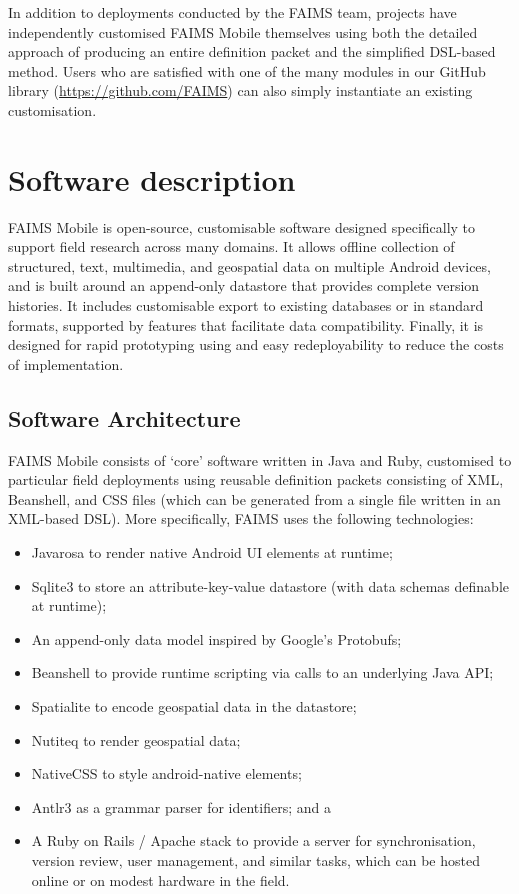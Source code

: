 \documentclass[preprint,12pt, a4paper]{elsarticle}
\begin{document}
In addition to deployments conducted by the FAIMS team, projects have independently customised FAIMS Mobile themselves using both the detailed approach of producing an entire definition packet and the simplified DSL-based method\cite{Good2016-gf, Kiley2016-sf}. Users who are satisfied with one of the many modules in our GitHub library (\url{https://github.com/FAIMS}) can also simply instantiate an existing customisation.

\section{Software description}


FAIMS Mobile is open-source, customisable software designed specifically to support field research across many domains. It allows offline collection of structured, text, multimedia, and geospatial data on multiple Android devices, and is built around an append-only datastore that provides complete version histories. It includes customisable export to existing databases or in standard formats, supported by features that facilitate data compatibility. Finally, it is designed for rapid prototyping using and easy redeployability to reduce the costs of implementation. 


\subsection{Software Architecture}



FAIMS Mobile consists of `core' software written in Java and Ruby, customised to particular field deployments using reusable definition packets consisting of XML, Beanshell, and CSS files (which can be generated from a single file written in an XML-based DSL). More specifically, FAIMS uses the following technologies:

\begin{itemize}
\item Javarosa to render native Android UI elements at runtime;
\item Sqlite3 to store an attribute-key-value datastore (with data schemas definable at runtime);
\item An append-only data model inspired by Google's Protobufs;
\item Beanshell to provide runtime scripting via calls to an underlying Java API;
\item Spatialite to encode geospatial data in the datastore;
\item Nutiteq to render geospatial data;
\item NativeCSS to style android-native elements;
\item Antlr3 as a grammar parser for identifiers; and a
\item A Ruby on Rails / Apache stack to provide a server for synchronisation, version review, user management, and similar tasks, which can be hosted online or on modest hardware in the field.
\end{itemize}
\end{document}
